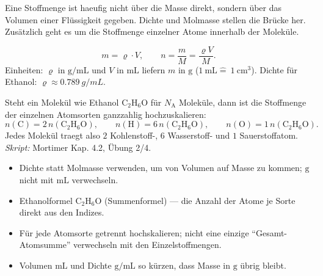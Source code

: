 

Eine Stoffmenge ist haeufig nicht über die Masse direkt, sondern über das
Volumen einer Flüssigkeit gegeben. Dichte und Molmasse stellen die Brücke her.
Zusätzlich geht es um die Stoffmenge einzelner Atome innerhalb der Moleküle.

\begin{werkzeugkasten}
\begin{equation}
  m = \varrho \cdot V,\qquad n = \frac{m}{M} = \frac{\varrho V}{M}.
\end{equation}
Einheiten: $\varrho$ in $\mathrm{g/mL}$ und $V$ in $\mathrm{mL}$ liefern $m$ in
$\mathrm{g}$ ($1\ \mathrm{mL} \hat{=}\ 1\ \mathrm{cm^3}$). Dichte für Ethanol:
$\varrho \approx \qty{0.789}{g/mL}$.

Steht ein Molekül wie Ethanol $\mathrm{C_2H_6O}$ für $N_{\mathrm{A}}$
Moleküle, dann ist die Stoffmenge der einzelnen Atomsorten ganzzahlig
hochzuskalieren:
\begin{equation}
  n(\mathrm{C}) = 2\, n(\mathrm{C_2H_6O}),\qquad
  n(\mathrm{H}) = 6\, n(\mathrm{C_2H_6O}),\qquad
  n(\mathrm{O}) = 1\, n(\mathrm{C_2H_6O}).
\end{equation}
Jedes Molekül traegt also $2$ Kohlenstoff-, $6$ Wasserstoff- und $1$
Sauerstoffatom.
\textit{Skript:} Mortimer Kap. 4.2, Übung 2/4.
\end{werkzeugkasten}

\begin{achtung}
\begin{itemize}
  \item Dichte statt Molmasse verwenden, um von Volumen auf Masse zu kommen;
        $\mathrm{g}$ nicht mit $\mathrm{mL}$ verwechseln.
  \item Ethanolformel $\mathrm{C_2H_6O}$ (Summenformel) --- die Anzahl der
        Atome je Sorte direkt aus den Indizes.
  \item Für jede Atomsorte getrennt hochskalieren; nicht eine einzige
        ``Gesamt-Atomsumme'' verwechseln mit den Einzelstoffmengen.
  \item Volumen $\mathrm{mL}$ und Dichte $\mathrm{g/mL}$ so kürzen, dass
        Masse in $\mathrm{g}$ übrig bleibt.
\end{itemize}
\end{achtung}
